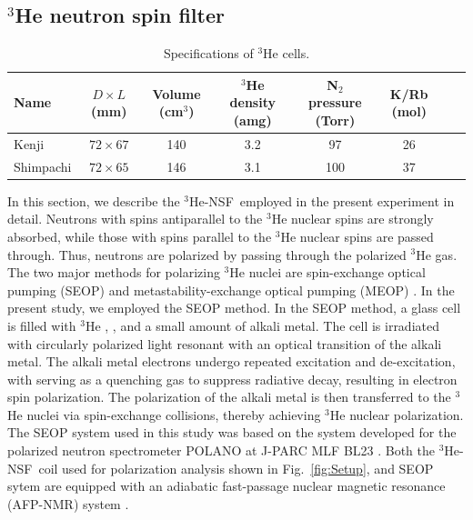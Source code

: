 \documentclass[%
 reprint,
superscriptaddress,
 amsmath,amssymb,
 aps,
floatfix,
]{revtex4-2}
\newcommand{\He}{$^3$He }
\newcommand{\Hensf}{$^3$He-NSF}
\begin{document}
\subsection{\He neutron spin filter}
\label{sec:hensf}
\begin{table}[t]
\caption{Specifications of \He cells.}
\label{tab:He_cell}
\begin{ruledtabular}
    \begin{tabular*}{\textwidth}{lccccccc}
        Name
        & $D \times L$ (mm)
        & Volume (cm$^3$)
        & \He density (amg)
        & N$_2$ pressure (Torr)
        & K/Rb (mol)\\
        \hline
        Kenji
        & $72 \times 67$
        & 140
        & 3.2
        & 97
        & 26\\
        Shimpachi
        & $72 \times 65$
        & 146
        & 3.1
        & 100
        & 37\\
    \end{tabular*}
\end{ruledtabular}
\end{table}
In this section, we describe the \Hensf~employed in the present experiment in detail.
Neutrons with spins antiparallel to the \He nuclear spins are strongly absorbed, while those with spins parallel to the \He nuclear spins are passed through.
Thus, neutrons are polarized by passing through the polarized \He gas.
The two major methods for polarizing \He nuclei are spin-exchange optical pumping (SEOP) \cite{bouchiat_nuclear_1960} and metastability-exchange optical pumping (MEOP) \cite{colegrove1963polarization}.
In the present study, we employed the SEOP method.
In the SEOP method, a glass cell is filled with \He, , and a small amount of alkali metal.
The cell is irradiated with circularly polarized light resonant with an optical transition of the alkali metal.
The alkali metal electrons undergo repeated excitation and de-excitation, with  serving as a quenching gas to suppress radiative decay, resulting in electron spin polarization.
The polarization of the alkali metal is then transferred to the \He nuclei via spin-exchange collisions, thereby achieving \He nuclear polarization.
The SEOP system used in this study was based on the system developed for the polarized neutron spectrometer POLANO at J-PARC MLF BL23 \cite{ino_development_2017}.
Both the \Hensf~coil used for polarization analysis shown in Fig.~\ref{fig:Setup}, and SEOP sytem are equipped with an adiabatic fast-passage nuclear magnetic resonance (AFP-NMR) system \cite{ino_compact_2012}.
\end{document}
